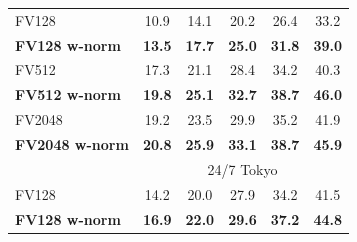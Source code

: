 \begin{table}[th!]
\begin{centering}
\begin{tabularx}{0.883\linewidth}{|l|c c c c c|}
        \hline 
          \rowcolor{maroon!10}
          FV128     & 10.9 & 14.1 & 20.2 & 26.4 & 33.2 \\
          \rowcolor{maroon!10}
          \textbf{FV128 w-norm}  & \textbf{13.5}  &  \textbf{17.7}  &  \textbf{25.0}  &  \textbf{31.8}  &  \textbf{39.0} \\
          \hline  
          \rowcolor{maroon!10}
          FV512   & 17.3 &  21.1 &  28.4 &  34.2 &  40.3 \\      
          \rowcolor{maroon!10}
          \rowcolor{maroon!10}
          \textbf{FV512 w-norm}  & \textbf{19.8} &  \textbf{25.1} &  \textbf{32.7}  & \textbf{38.7} &  \textbf{46.0} \\
          \hline
        \rowcolor{maroon!10}
        FV2048        & 19.2 & 23.5 & 29.9 &  35.2 &  41.9 \\
        \rowcolor{maroon!10}
            \textbf{FV2048 w-norm}  & \textbf{20.8} & \textbf{25.9} & \textbf{33.1} & \textbf{38.7} & \textbf{45.9} \\
            \hline
          \rowcolor{maroon!40}
          \multicolumn{1}{|c}{\quad} & \multicolumn{5}{c|}{24/7 Tokyo} \\
        \hline
        \rowcolor{maroon!10}
        {FV128}             &{14.2}     
                                &{20.0}     
                                &{27.9}     
                                &{34.2}     
                                &{41.5} \\
        \rowcolor{maroon!10}
        {\textbf{FV128 w-norm}}         &{\textbf{16.9}}     
                                &{\textbf{22.0}}    
                                &{\textbf{29.6}}    
                                &{\textbf{37.2}}     
                                &{\textbf{44.8}} \\  

\end{tabularx}
\end{centering}
\end{table}
